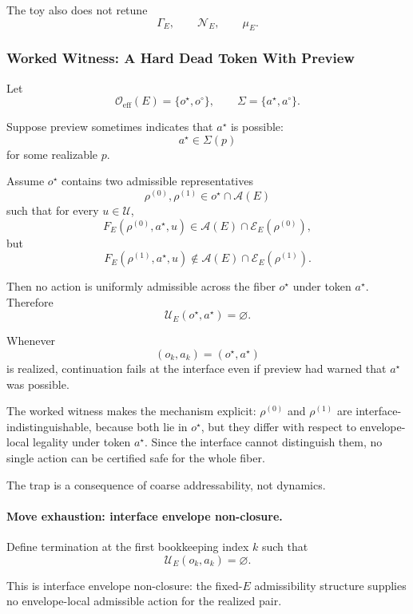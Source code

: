 \documentclass[aps,prx,onecolumn,11pt]{revtex4-2}
\theoremstyle{plain}
\theoremstyle{definition}
\theoremstyle{remark}
\begin{document}
The toy also does not retune
\[
\Gamma_E,
\qquad
\mathcal N_E,
\qquad
\mu_E.
\]

\subsubsection{Worked Witness: A Hard Dead Token With Preview}
\label{toy:preview_worked_witness}

Let
\[
\mathcal O_{\mathrm{eff}}(E)=\{o^\star,o^\circ\},
\qquad
\Sigma=\{a^\star,a^\circ\}.
\]

Suppose preview sometimes indicates that \(a^\star\) is possible:
\[
a^\star\in\Sigma(p)
\]
for some realizable \(p\).

Assume \(o^\star\) contains two admissible representatives
\[
\rho^{(0)},\rho^{(1)}
\in
o^\star\cap\mathcal A(E)
\]
such that for every \(u\in\mathcal U\),
\[
F_E(\rho^{(0)},a^\star,u)
\in
\mathcal A(E)\cap\mathcal E_E(\rho^{(0)}),
\]
but
\[
F_E(\rho^{(1)},a^\star,u)
\notin
\mathcal A(E)\cap\mathcal E_E(\rho^{(1)}).
\]

Then no action is uniformly admissible across the fiber \(o^\star\)
under token \(a^\star\). Therefore
\[
\mathcal U_E(o^\star,a^\star)=\varnothing.
\]

Whenever
\[
(o_k,a_k)=(o^\star,a^\star)
\]
is realized, continuation fails at the interface even if preview had
warned that \(a^\star\) was possible.

The worked witness makes the mechanism explicit:
\(\rho^{(0)}\) and \(\rho^{(1)}\) are interface-indistinguishable,
because both lie in \(o^\star\), but they differ with respect to
envelope-local legality under token \(a^\star\). Since the interface
cannot distinguish them, no single action can be certified safe for the
whole fiber.

The trap is a consequence of coarse addressability, not dynamics.

\paragraph{Move exhaustion: interface envelope non-closure.}

Define termination at the first bookkeeping index \(k\) such that
\begin{equation}
\mathcal U_E(o_k,a_k)=\varnothing.
\label{eq:toy_preview_move_exhaustion}
\end{equation}

This is interface envelope non-closure: the fixed-\(E\) admissibility
structure supplies no envelope-local admissible action for the realized
pair.
\end{document}

